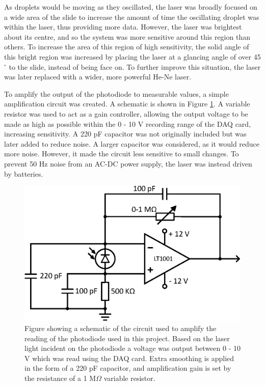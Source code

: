 \documentclass{physics_article_B}
\begin{document}
        As droplets would be moving as they oscillated, the laser was broadly focused on a wide area of the slide to increase the amount of time the oscillating droplet was within the laser, thus providing more data. However, the laser was brightest about its centre, and so the system was more sensitive around this region than others. To increase the area of this region of high sensitivity, the solid angle of this bright region was increased by placing the laser at a glancing angle of over 45$^{\circ}$ to the slide, instead of being face on. To further improve this situation, the laser was later replaced with a wider, more powerful He-Ne laser.
        
        \newpage To amplify the output of the photodiode to measurable values, a simple amplification circuit was created\cite{artofelectronics}. A schematic is shown in Figure \ref{fig:PDCircuit}. A variable resistor was used to act as a gain controller, allowing the output voltage to be made as high as possible within the 0 - 10 V recording range of the DAQ card, increasing sensitivity. A 220 pF capacitor was not originally included but was later added to reduce noise\cite{artofelectronics}. A larger capacitor was considered, as it would reduce more noise. However, it made the circuit less sensitive to small changes. To prevent 50 Hz noise from an AC-DC power supply, the laser was instead driven by batteries.
    
            \begin{figure}[H]
                \centering
                \hspace{0.1cm}\includegraphics[scale=0.8]{Figures/PDCircuit.eps}
                \caption{Figure showing a schematic of the circuit used to amplify the reading of the photodiode used in this project. Based on the laser light incident on the photodiode a voltage was output between 0 - 10 V which was read using the DAQ card. Extra smoothing is applied in the form of a 220 pF capacitor, and amplification gain is set by the resistance of a 1 M$\Omega$ variable resistor.}
                \label{fig:PDCircuit}
            \end{figure}
    
\end{document}
